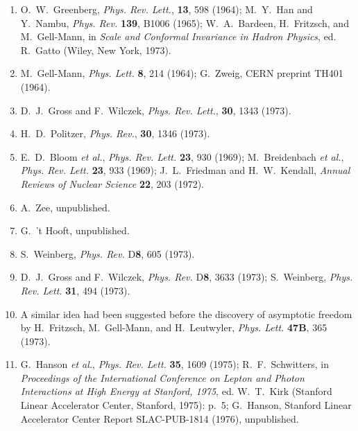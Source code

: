 \begin{enumerate}
  \item {}\label{ch18-ref-10}
  O.~W.~Greenberg, \textit{Phys. Rev. Lett.}, \textbf{13}, 598 (1964); M.~Y.~Han and Y.~Nambu, \textit{Phys. Rev.} \textbf{139}, B1006 (1965); W.~A.~Bardeen, H.~Fritzsch, and M.~Gell-Mann, in \textit{Scale and Conformal Invariance in Hadron Physics}, ed. R.~Gatto (Wiley, New York, 1973).

  \item {}\label{ch18-ref-11}
  M.~Gell-Mann, \textit{Phys. Lett.} \textbf{8}, 214 (1964); G.~Zweig, CERN preprint TH401 (1964).

  \item {}\label{ch18-ref-12}
  D.~J.~Gross and F.~Wilczek, \textit{Phys. Rev. Lett.}, \textbf{30}, 1343 (1973).

  \item {}\label{ch18-ref-13}
  H.~D.~Politzer, \textit{Phys. Rev.}, \textbf{30}, 1346 (1973).

  \item {}\label{ch18-ref-14}
  E.~D.~Bloom \textit{et al.}, \textit{Phys. Rev. Lett.} \textbf{23}, 930 (1969); M.~Breidenbach \textit{et al.}, \textit{Phys. Rev. Lett.} \textbf{23}, 933 (1969); J.~L.~Friedman and H.~W.~Kendall, \textit{Annual Reviews of Nuclear Science} \textbf{22}, 203 (1972).

  \item {}\label{ch18-ref-15}
  A.~Zee, unpublished.

  \item {}\label{ch18-ref-16}
  G.~'t Hooft, unpublished.

  \item {}\label{ch18-ref-17}
  S.~Weinberg, \textit{Phys. Rev.} D\textbf{8}, 605 (1973).

  \item {}\label{ch18-ref-18}
  D.~J.~Gross and F.~Wilczek, \textit{Phys. Rev.} D\textbf{8}, 3633 (1973); S.~Weinberg, \textit{Phys. Rev. Lett.} \textbf{31}, 494 (1973).

  \item {}\label{ch18-ref-19}
  A similar idea had been suggested before the discovery of asymptotic freedom by H.~Fritzsch, M.~Gell-Mann, and H.~Leutwyler, \textit{Phys. Lett.} \textbf{47B}, 365 (1973).

  \item {}\label{ch18-ref-20}
  G.~Hanson \textit{et al.}, \textit{Phys. Rev. Lett.} \textbf{35}, 1609 (1975); R.~F.~Schwitters, in \textit{Proceedings of the International Conference on Lepton and Photon Interactions at High Energy at Stanford, 1975}, ed. W.~T.~Kirk (Stanford Linear Accelerator Center, Stanford, 1975): p.~5; G.~Hanson, Stanford Linear Accelerator Center Report SLAC-PUB-1814 (1976), unpublished.


\end{enumerate}
